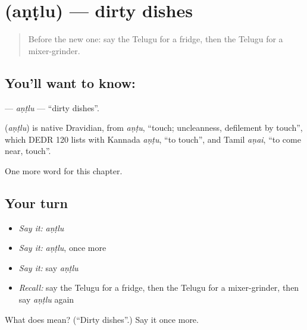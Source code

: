 \section[\texorpdfstring{\te{అంట్లు} (aṇṭlu)}{అంట్లు (aṇṭlu)}]{ (aṇṭlu) — dirty dishes}

\label{lesson:TE-C307-antlu}



\begin{quote}
Before the new one: say the Telugu for a fridge, then the Telugu for a mixer-grinder.
\end{quote}

\subsection*{You'll want to know: }
\textbf{} — \emph{aṇṭlu} — \textquotedblleft{}dirty dishes\textquotedblright{}.

\begin{cousinweb}
\textbf{} (\emph{aṇṭlu}) is native Dravidian, from \emph{aṇṭu}, \textquotedblleft{}touch; uncleanness, defilement by touch\textquotedblright{}, which DEDR 120 lists with Kannada \emph{aṇṭu}, \textquotedblleft{}to touch\textquotedblright{}, and Tamil \emph{aṇai}, \textquotedblleft{}to come near, touch\textquotedblright{}.
\end{cousinweb}

\begin{grammarlens}[title={What you've built}]
One more word for this chapter.
\end{grammarlens}

\subsection*{Your turn}
\begin{itemize}
\raggedright
  \item \emph{Say it:} \emph{aṇṭlu}
  \item \emph{Say it:} \emph{aṇṭlu}, once more
  \item \emph{Say it:} say \emph{aṇṭlu}
  \item \emph{Recall:} say the Telugu for a fridge, then the Telugu for a mixer-grinder, then say \emph{aṇṭlu} again
\end{itemize}

\begin{tcolorbox}[breakable,colback=teal!4,colframe=teal!35!black,title={Before you move on}]
What does  mean? (\textquotedblleft{}Dirty dishes\textquotedblright{}.) Say it once more.
\end{tcolorbox}
